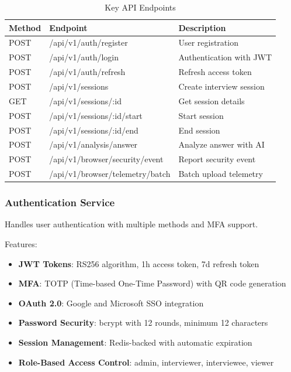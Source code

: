 \documentclass[11pt,letterpaper]{article}
\begin{document}
\begin{table}[H]
\centering
\small
\begin{tabularx}{\textwidth}{llX}
\toprule
\textbf{Method} & \textbf{Endpoint} & \textbf{Description} \\
\midrule
POST & /api/v1/auth/register & User registration \\
POST & /api/v1/auth/login & Authentication with JWT \\
POST & /api/v1/auth/refresh & Refresh access token \\
POST & /api/v1/sessions & Create interview session \\
GET & /api/v1/sessions/:id & Get session details \\
POST & /api/v1/sessions/:id/start & Start session \\
POST & /api/v1/sessions/:id/end & End session \\
POST & /api/v1/analysis/answer & Analyze answer with AI \\
POST & /api/v1/browser/security/event & Report security event \\
POST & /api/v1/browser/telemetry/batch & Batch upload telemetry \\
\bottomrule
\end{tabularx}
\caption{Key API Endpoints}
\end{table}

\subsubsection{Authentication Service}

Handles user authentication with multiple methods and MFA support.

Features:
\begin{itemize}[noitemsep]
    \item \textbf{JWT Tokens}: RS256 algorithm, 1h access token, 7d refresh token
    \item \textbf{MFA}: TOTP (Time-based One-Time Password) with QR code generation
    \item \textbf{OAuth 2.0}: Google and Microsoft SSO integration
    \item \textbf{Password Security}: bcrypt with 12 rounds, minimum 12 characters
    \item \textbf{Session Management}: Redis-backed with automatic expiration
    \item \textbf{Role-Based Access Control}: admin, interviewer, interviewee, viewer
\end{itemize}
\end{document}

